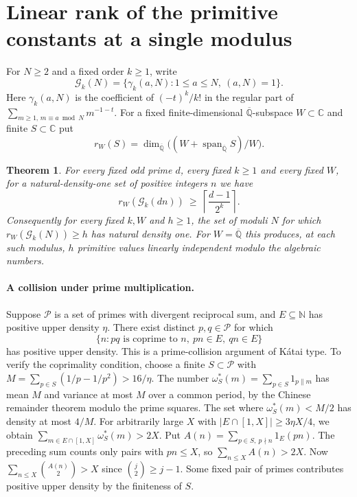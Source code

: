 \documentclass[11pt,a4paper,oneside,openany]{report}
\newtheorem{theorem}{Theorem}[section]
\theoremstyle{remark}\newtheorem{remark}[theorem]{Remark}
\numberwithin{equation}{section}
\begin{document}
\section{Linear rank of the primitive constants at a single modulus}
For $N\ge2$ and a fixed order $k\ge1$, write
\[
 \mathcal G_k(N)=\{\gamma_k(a,N):1\le a\le N,\ (a,N)=1\}.
\]
Here $\gamma_k(a,N)$ is the coefficient of $(-t)^k/k!$ in the
regular part of $\sum_{m\ge1,\,m\equiv a\bmod N}m^{-1-t}$.
For a fixed finite-dimensional $\overline{\mathbb Q}$-subspace
$W\subset\mathbb C$ and finite $S\subset\mathbb C$ put
\[
 r_W(S)=\dim_{\overline{\mathbb Q}}
 \big((W+\operatorname{span}_{\overline{\mathbb Q}}S)/W\big).
\]
\begin{theorem}\label{ch6:thm:primitive-single-rank}
For every fixed odd prime $d$, every fixed $k\ge1$ and every fixed $W$,
for a natural-density-one set of positive integers $n$ we have
\[
 r_W(\mathcal G_k(dn))\ \ge\
 \left\lceil\frac{d-1}{2^k}\right\rceil .
\]
Consequently for every fixed $k,W$ and $h\ge1$, the set of moduli $N$
for which $r_W(\mathcal G_k(N))\ge h$ has natural density one.
For $W=\overline{\mathbb Q}$ this produces, at each such modulus,
$h$ primitive values linearly independent modulo the algebraic numbers.
\end{theorem}
\paragraph{A collision under prime multiplication.}
Suppose $\mathcal P$ is a set of primes with divergent reciprocal sum,
and $E\subseteq\mathbb N$ has positive upper density $\eta$. There
exist distinct $p,q\in\mathcal P$ for which
\[
 \{n:pq\text{ is coprime to } n,\ pn\in E,\ qn\in E\}
\]
has positive upper density. This is a prime-collision argument of
K\'atai type. To verify the coprimality condition, choose a finite
$S\subset\mathcal P$ with $M=\sum_{p\in S}(1/p-1/p^2)>16/\eta$.
The number $\omega_S^*(m)=\sum_{p\in S}1_{p\parallel m}$ has mean $M$
and variance at most $M$ over a common period, by the Chinese
remainder theorem modulo the prime squares. The set where
$\omega_S^*(m)<M/2$ has density at most $4/M$. For arbitrarily large
$X$ with $|E\cap[1,X]|\ge3\eta X/4$, we obtain
$\sum_{m\in E\cap[1,X]}\omega_S^*(m)>2X$. Put
$A(n)=\sum_{p\in S,\ p\nmid n}1_E(pn)$. The preceding sum counts
only pairs with $pn\le X$, so $\sum_{n\le X}A(n)>2X$.
Now $\sum_{n\le X}\binom{A(n)}2>X$ since $\binom j2\ge j-1$.
Some fixed pair of primes contributes positive upper density by the
finiteness of $S$.
\end{document}
